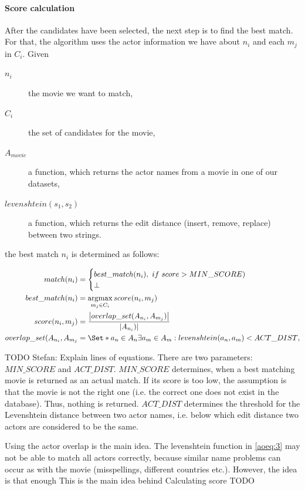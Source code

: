 \paragraph{Score calculation}
After the candidates have been selected, the next step is to find the best match.
For that, the algorithm uses the actor information we have about $n_i$ and each $m_j$ in $C_i$.
Given
\begin{description}
	\item[$n_i$] the movie we want to match,
	\item[$C_i$] the set of candidates for the movie,
	\item[$A_{movie}$] a function, which returns the actor names from a movie in one of our datasets,
	\item[$levenshtein(s_1, s_2)$] a function, which returns the edit distance (insert, remove, replace) between two strings.
\end{description}
the best match $n_i$ is determined as follows:

\begin{align}
	match(n_i) &=
		\begin{cases}
			best\_match(n_i),~if~score > MIN\_SCORE) \\
			\bot
		\end{cases} \\
	best\_match(n_i) &=
		\argmax_{m_j \in C_i} score(n_i, m_j)\label{aoeq:1}\\
	score(n_i, m_j) &=
		\frac
			{\left\lvert overlap\_set(A_{n_i}, A_{m_j}) \right\rvert}
			{\left\lvert A_{n_i}) \right\rvert}\label{aoeq:2}\\
	overlap\_set(A_{n_i}, A_{m_j} &=
		\Set*{a_n \in A_n}{\exists a_m \in A_m: levenshtein(a_n, a_m) < ACT\_DIST},\label{aoeq:3}
\end{align}

TODO Stefan: Explain lines of equations.
There are two parameters: $MIN\_SCORE$ and $ACT\_DIST$.
$MIN\_SCORE$ determines, when a best matching movie is returned as an actual match.
If its score is too low, the assumption is that the movie is not the right one (i.e. the correct one does not exist in the database).
Thus, nothing is returned.
$ACT\_DIST$ determines the threshold for the Levenshtein distance between two actor names, i.e. below which edit distance two actors are considered to be the same.

Using the actor overlap is the main idea.
The levenshtein function in \ref{aoeq:3} may not be able to match all actors correctly, because similar name problems can occur as with the movie (misspellings, different countries etc.).
However, the idea is that enough 
This is the main idea behind 
Calculating score TODO

